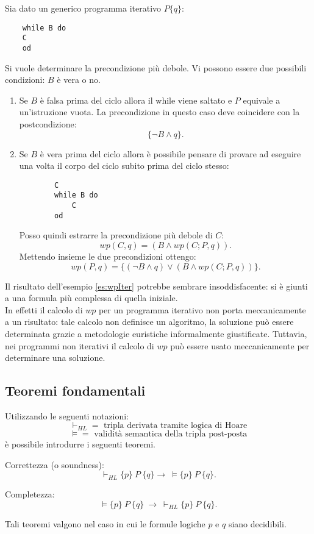 \begin{es}
	\label{es:wpIter}
	Sia dato un generico programma iterativo $P\{q\}$:
	\begin{lstlisting}
	while B do
	C
	od
	\end{lstlisting}
	Si vuole determinare la precondizione pi\`u debole.
	Vi possono essere due possibili condizioni: $B$ \`e vera o no. 
	\begin{enumerate}
		\item Se $B$ \`e falsa prima del ciclo allora il while viene saltato e $P$ equivale a un'istruzione vuota. La precondizione in questo caso deve coincidere con la postcondizione: $$\{\neg B \land q \}.$$
		\item Se $B$ \`e vera prima del ciclo allora \`e possibile pensare di provare ad eseguire una volta il corpo del ciclo subito prima del ciclo stesso:
		\begin{lstlisting}
		C
		while B do
			C
		od
		\end{lstlisting}
		Posso quindi estrarre la precondizione pi\`u debole di $C$: $$wp(C, q) = (B \land wp(C;P,q)).$$
		Mettendo insieme le due precondizioni ottengo: $$wp(P, q)=\{(\neg B \land q )  \lor (B \land wp(C;P,q))\}.$$
	\end{enumerate}
\end{es}
Il risultato dell'esempio \ref{es:wpIter} potrebbe sembrare insoddisfacente: si \`e giunti a una formula pi\`u complessa di quella iniziale. \\
In effetti il calcolo di $wp$ per un programma iterativo non porta meccanicamente a un risultato: tale calcolo non definisce un algoritmo, la soluzione pu\`o essere determinata grazie a metodologie euristiche informalmente giustificate. Tuttavia, nei programmi non iterativi il calcolo di $wp$ pu\`o essere usato meccanicamente per determinare una soluzione.

\subsection{Teoremi fondamentali}
Utilizzando le seguenti notazioni: 
$$ \vdash_{HL} = \text{ tripla derivata tramite logica di Hoare}$$
$$ \models = \text{ validit\`a semantica della tripla post-posta}$$
\`e possibile introdurre i seguenti teoremi.
\begin{teor}
	Correttezza (o soundness):
$$\vdash_{HL} \{p\}\ P\ \{q\} \rightarrow\  \models\{p\}\ P\ \{q\}.$$
\end{teor}
\begin{teor}
	Completezza:
	$$\models\{p\}\ P\ \{q\}\ \rightarrow\  \vdash_{HL} \{p\}\ P\ \{q\}.$$
\end{teor}
Tali teoremi valgono nel caso in cui le formule logiche $p$ e $q$ siano decidibili.